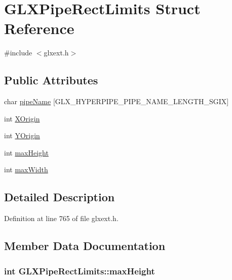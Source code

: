 \hypertarget{struct_g_l_x_pipe_rect_limits}{
\section{GLXPipeRectLimits Struct Reference}
\label{struct_g_l_x_pipe_rect_limits}
}


{\ttfamily \#include $<$glxext.h$>$}

\subsection*{Public Attributes}
\begin{DoxyCompactItemize}
\item 
char \hyperlink{struct_g_l_x_pipe_rect_limits_ae78b4b6656101bc841946733a5b6e5ce}{pipeName} \mbox{[}GLX\_\-HYPERPIPE\_\-PIPE\_\-NAME\_\-LENGTH\_\-SGIX\mbox{]}
\item 
int \hyperlink{struct_g_l_x_pipe_rect_limits_a3e5a965059d9f5d2ca42acd35af5bb9b}{XOrigin}
\item 
int \hyperlink{struct_g_l_x_pipe_rect_limits_a50e06bcf0dae95854be7d93a515199e9}{YOrigin}
\item 
int \hyperlink{struct_g_l_x_pipe_rect_limits_a27572e499c0d3280031c2ad8e387c0c1}{maxHeight}
\item 
int \hyperlink{struct_g_l_x_pipe_rect_limits_a8662c7a712b30620e25fc994adf337a1}{maxWidth}
\end{DoxyCompactItemize}


\subsection{Detailed Description}


Definition at line 765 of file glxext.h.



\subsection{Member Data Documentation}
\hypertarget{struct_g_l_x_pipe_rect_limits_a27572e499c0d3280031c2ad8e387c0c1}{
\subsubsection[{maxHeight}]{\setlength{\rightskip}{0pt plus 5cm}int {\bf GLXPipeRectLimits::maxHeight}}}
\label{struct_g_l_x_pipe_rect_limits_a27572e499c0d3280031c2ad8e387c0c1}


